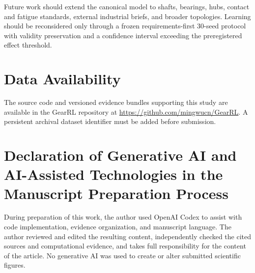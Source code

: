 \documentclass[preprint,12pt]{elsarticle}
\begin{document}
Future work should extend the canonical model to shafts, bearings, hubs, contact and fatigue standards, external industrial briefs, and broader topologies. Learning should be reconsidered only through a frozen requirements-first 30-seed protocol with validity preservation and a confidence interval exceeding the preregistered effect threshold.

\section{Data Availability}
The source code and versioned evidence bundles supporting this study are available in the GearRL repository at \url{https://github.com/mingwucn/GearRL}. A persistent archival dataset identifier must be added before submission.

\section{Declaration of Generative AI and AI-Assisted Technologies in the Manuscript Preparation Process}
During preparation of this work, the author used OpenAI Codex to assist with code implementation, evidence organization, and manuscript language. The author reviewed and edited the resulting content, independently checked the cited sources and computational evidence, and takes full responsibility for the content of the article. No generative AI was used to create or alter submitted scientific figures.
\end{document}
